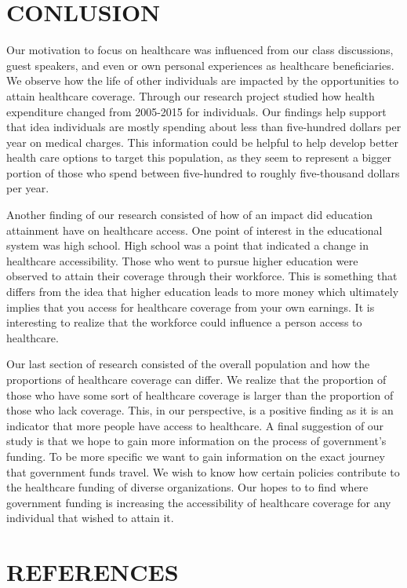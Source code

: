 \documentclass[10pt,]{article}
\begin{document}
\section{CONLUSION}\label{conlusion}

Our motivation to focus on healthcare was influenced from our class
discussions, guest speakers, and even or own personal experiences as
healthcare beneficiaries. We observe how the life of other individuals
are impacted by the opportunities to attain healthcare coverage. Through
our research project studied how health expenditure changed from
2005-2015 for individuals. Our findings help support that idea
individuals are mostly spending about less than five-hundred dollars per
year on medical charges. This information could be helpful to help
develop better health care options to target this population, as they
seem to represent a bigger portion of those who spend between
five-hundred to roughly five-thousand dollars per year.

Another finding of our research consisted of how of an impact did
education attainment have on healthcare access. One point of interest in
the educational system was high school. High school was a point that
indicated a change in healthcare accessibility. Those who went to pursue
higher education were observed to attain their coverage through their
workforce. This is something that differs from the idea that higher
education leads to more money which ultimately implies that you access
for healthcare coverage from your own earnings. It is interesting to
realize that the workforce could influence a person access to
healthcare.

Our last section of research consisted of the overall population and how
the proportions of healthcare coverage can differ. We realize that the
proportion of those who have some sort of healthcare coverage is larger
than the proportion of those who lack coverage. This, in our
perspective, is a positive finding as it is an indicator that more
people have access to healthcare. A final suggestion of our study is
that we hope to gain more information on the process of government's
funding. To be more specific we want to gain information on the exact
journey that government funds travel. We wish to know how certain
policies contribute to the healthcare funding of diverse organizations.
Our hopes to to find where government funding is increasing the
accessibility of healthcare coverage for any individual that wished to
attain it.

\section{REFERENCES}\label{references}
\end{document}
